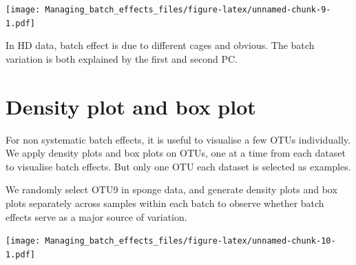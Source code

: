 \documentclass[]{book}
\newenvironment{Shaded}{\begin{snugshade}}{\end{snugshade}}
\newcommand{\KeywordTok}[1]{\textcolor[rgb]{0.13,0.29,0.53}{\textbf{#1}}}
\newcommand{\DataTypeTok}[1]{\textcolor[rgb]{0.13,0.29,0.53}{#1}}
\newcommand{\DecValTok}[1]{\textcolor[rgb]{0.00,0.00,0.81}{#1}}
\newcommand{\StringTok}[1]{\textcolor[rgb]{0.31,0.60,0.02}{#1}}
\newcommand{\CommentTok}[1]{\textcolor[rgb]{0.56,0.35,0.01}{\textit{#1}}}
\newcommand{\OperatorTok}[1]{\textcolor[rgb]{0.81,0.36,0.00}{\textbf{#1}}}
\newcommand{\NormalTok}[1]{#1}
\begin{document}
\texttt{[image: Managing\_batch\_effects\_files/figure-latex/unnamed-chunk-9-1.pdf]}

In HD data, batch effect is due to different cages and obvious. The
batch variation is both explained by the first and second PC.

\section{Density plot and box plot}\label{density-plot-and-box-plot}

For non systematic batch effects, it is useful to visualise a few OTUs
individually. We apply density plots and box plots on OTUs, one at a
time from each dataset to visualise batch effects. But only one OTU each
dataset is selected as examples.

We randomly select OTU9 in sponge data, and generate density plots and
box plots separately across samples within each batch to observe whether
batch effects serve as a major source of variation.

\begin{Shaded}
\end{Shaded}

\texttt{[image: Managing\_batch\_effects\_files/figure-latex/unnamed-chunk-10-1.pdf]}
\end{document}
